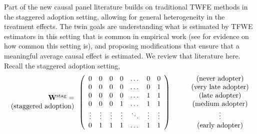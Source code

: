 \documentclass[letterpaper,12pt,leqno]{article}
\newcommand{\stag}{{\rm stag}}
\newcommand{\ttock}{1}
\newcommand{\ttick}{0}
\newcommand{\bw}{{\bf W}}
\begin{document}
Part of the new causal panel literature 
builds on traditional TWFE methods in the staggered adoption setting, allowing for general heterogeneity in the treatment effects.
The twin goals are understanding what is estimated by TFWE estimators in this setting that is common in empirical work (see \citealp{de2023two} for evidence on how common this setting is), and proposing modifications that ensure that a meaningful average causal effect is estimated.
We review that literature here.
Recall the staggered adoption setting,
\[
\begin{array}{r}{\bw^\stag=} \\
{(\text{staggered  adoption})}
\end{array}
\left(
\begin{array}{ccccccccc}
	\ttick &  \ttick & \ttick  & \ttick & \dots & \ttick & \ttick \\
	\ttick  & \ttick &  \ttick & \ttick   & \dots  & \ttick& {\ttock}  \\
	\ttick  & \ttick &  \ttick  & \ttick  & \dots  & \ttock& {\ttock}  \\
	\ttick  & \ttick & \ttick &  {\ttock}   & \dots & \ttock & {\ttock}  \\
	\vdots   &  \vdots  &  \vdots& \vdots &\ddots &\vdots &\vdots \\
	\ttick  & {\ttock} &  {\ttock}   & {\ttock} & \dots  & \ttock& {\ttock}  \\
\end{array}
\right)
\quad\ \quad
\begin{array}{c}\textrm{(never adopter)}
\\ \textrm{(very late adopter)}
\\ \textrm{(late adopter)}
\\ \textrm{(medium adopter)}
\\ \vdots
\\ \textrm{(early adopter)}
\end{array}
\]
\end{document}
